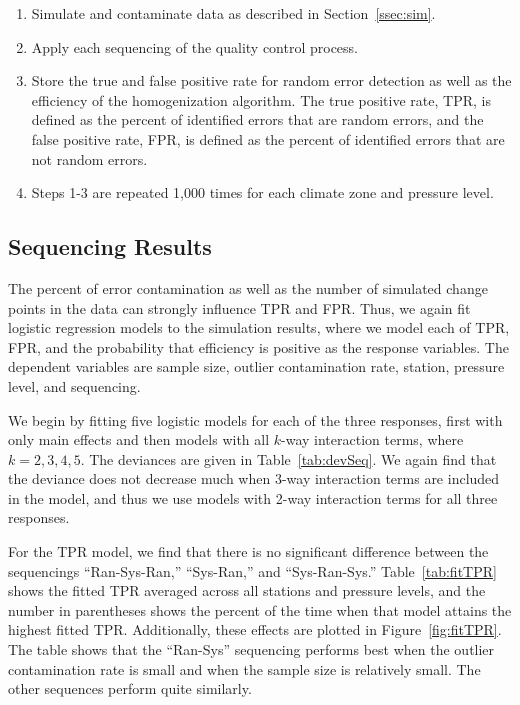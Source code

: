 \documentclass[12pt]{article}
\begin{document}
\begin{doublespacing}
\begin{enumerate}
	\item Simulate and contaminate data as described in Section~\ref{ssec:sim}.
	\item Apply each sequencing of the quality control process.
	\item Store the true and false positive rate for random error detection as well as the efficiency of the homogenization algorithm.  The true positive rate, TPR, is defined as the percent of identified errors that are random errors, and the false positive rate, FPR, is defined as the percent of identified errors that are not random errors.
	\item Steps 1-3 are repeated 1,000 times for each climate zone and pressure level.
\end{enumerate}

\subsection{Sequencing Results}

The percent of error contamination as well as the number of simulated change points in the data can strongly influence TPR and FPR.  Thus, we again fit logistic regression models to the simulation results, where we model each of TPR, FPR, and the probability that efficiency is positive as the response variables.  The dependent variables are sample size, outlier contamination rate, station, pressure level, and sequencing.

We begin by fitting five logistic models for each of the three responses, first with only main effects and then models with all $k$-way interaction terms, where $k=2,3,4,5$.  The deviances are given in Table~\ref{tab:devSeq}.  We again find that the deviance does not decrease much when 3-way interaction terms are included in the model, and thus we use models with 2-way interaction terms for all three responses.

For the TPR model, we find that there is no significant difference between the sequencings ``Ran-Sys-Ran,'' ``Sys-Ran,'' and ``Sys-Ran-Sys.''  Table~\ref{tab:fitTPR} shows the fitted TPR averaged across all stations and pressure levels, and the number in parentheses shows the percent of the time when that model attains the highest fitted TPR.  Additionally, these effects are plotted in Figure~\ref{fig:fitTPR}.  The table shows that the ``Ran-Sys'' sequencing performs best when the outlier contamination rate is small and when the sample size is relatively small.  The other sequences perform quite similarly.  


\end{doublespacing}
\end{document}
